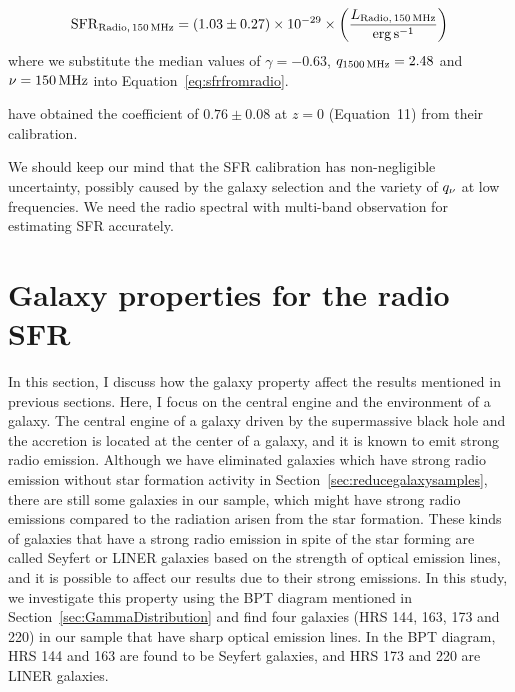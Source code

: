 \begin{equation}\label{eq:sfrradio_calibration}
    \mathrm{SFR}_{\mathrm{Radio},\,150\,\mathrm{MHz}} = \left(1.03\pm0.27\right) \times 10^{-29} \times \left(\frac{L_{\mathrm{Radio},\,150\,\mathrm{MHz}}}{\mathrm{erg}\,\mathrm{s}^{-1}}\right)
\end{equation}
where we substitute the median values of $\gamma=-0.63$, $q_{\mathrm{1500\,\mathrm{MHz}}}=2.48$ and $\nu=150\,\mathrm{MHz}$ into Equation~\ref{eq:sfrfromradio}.

\citet{CalistroRivera2017a} have obtained the coefficient of $0.76 \pm 0.08$ at $z = 0$ (Equation~11) from their calibration.

We should keep our mind that the SFR calibration has non-negligible uncertainty, possibly caused by the galaxy selection and the variety of $q_{\nu}$ at low frequencies.
We need the radio spectral with multi-band observation for estimating SFR accurately.



\section{Galaxy properties for the radio SFR}\label{sec:galaxypropertiesfortheradiosfr}

In this section, I discuss how the galaxy property affect the results mentioned in previous sections.
Here, I focus on the central engine and the environment of a galaxy.
The central engine of a galaxy driven by the supermassive black hole and the accretion is located at the center of a galaxy, and it is known to emit strong radio emission.
Although we have eliminated galaxies which have strong radio emission without star formation activity in Section~\ref{sec:reducegalaxysamples}, there are still some galaxies in our sample, which might have strong radio emissions compared to the radiation arisen from the star formation.
These kinds of galaxies that have a strong radio emission in spite of the star forming are called Seyfert or LINER galaxies based on the strength of optical emission lines, and it is possible to affect our results due to their strong emissions.
In this study, we investigate this property using the BPT diagram mentioned in Section~\ref{sec:GammaDistribution} and find four galaxies (HRS 144, 163, 173 and 220) in our sample that have sharp optical emission lines.
In the BPT diagram, HRS 144 and 163 are found to be Seyfert galaxies, and HRS 173 and 220 are LINER galaxies.

